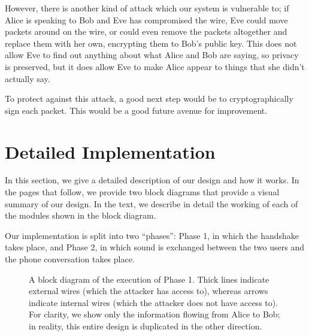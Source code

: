 \documentclass[a4paper]{report}
\begin{document}
However, there is another kind of attack which our system is vulnerable to; if Alice is speaking to Bob and Eve has compromised the wire, Eve could move packets around on the wire, or could even remove the packets altogether and replace them with her own, encrypting them to Bob's public key. This does not allow Eve to find out anything about what Alice and Bob are saying, so privacy is preserved, but it does allow Eve to make Alice appear to things that she didn't actually say.

To protect against this attack, a good next step would be to cryptographically sign each packet. This would be a good future avenue for improvement.

\chapter{Detailed Implementation}

In this section, we give a detailed description of our design and how it works. In the pages that follow, we provide two block diagrams that provide a visual summary of our design. In the text, we describe in detail the working of each of the modules shown in the block diagram.

Our implementation is split into two ``phases'': Phase 1, in which the handshake takes place, and Phase 2, in which sound is exchanged between the two users and the phone conversation takes place.

\begin{figure}
\label{fig3}
%
\centering \caption{A block diagram of the execution of Phase 1. Thick lines indicate external wires (which the attacker has access to), whereas arrows indicate internal wires (which the attacker does not have access to). For clarity, we show only the information flowing from Alice to Bob; in reality, this entire design is duplicated in the other direction.}
\end{figure}
\end{document}

